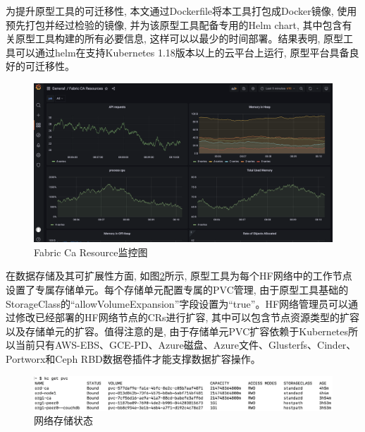 为提升原型工具的可迁移性, 本文通过Dockerfile将本工具打包成Docker镜像, 使用预先打包并经过检验的镜像, 并为该原型工具配备专用的Helm chart, 其中包含有关原型工具构建的所有必要信息, 这样可以以最少的时间部署。结果表明, 原型工具可以通过helm在支持Kubernetes 1.18版本以上的云平台上运行, 原型平台具备良好的可迁移性。

\begin{figure}[h] %
    \centering %
    \includegraphics[width=1.0\textwidth]{FIGs/chapter5/monitoring.png} %
    \caption{Fabric Ca Resource监控图} %
    \label{monitoring} %
\end{figure}%

在数据存储及其可扩展性方面, 如图\ref{db}所示, 原型工具为每个HF网络中的工作节点设置了专属存储单元。每个存储单元配置专属的PVC管理, 由于原型工具基础的StorageClass的“allowVolumeExpansion”字段设置为“true”。HF网络管理员可以通过修改已经部署的HF网络节点的CRs进行扩容, 其中可以包含节点资源类型的扩容以及存储单元的扩容。值得注意的是, 由于存储单元PVC扩容依赖于Kubernetes所以当前只有AWS-EBS、GCE-PD、Azure磁盘、Azure文件、Glusterfs、Cinder、Portworx和Ceph RBD数据卷插件才能支撑数据扩容操作。

\begin{figure}[h] %
    \centering %
    \includegraphics[width=1.0\textwidth]{FIGs/chapter5/db.png} %
    \caption{网络存储状态} %
    \label{db} %
\end{figure}%


